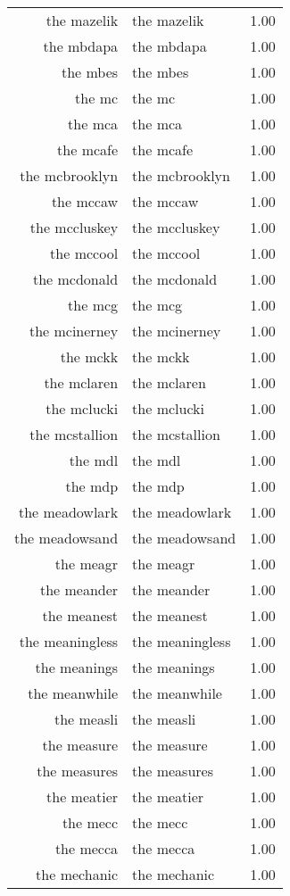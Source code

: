 \begin{table}[ht]
\begin{tabular}{rlr}
  the mazelik & the mazelik & 1.00 \\ 
  the mbdapa & the mbdapa & 1.00 \\ 
  the mbes & the mbes & 1.00 \\ 
  the mc & the mc & 1.00 \\ 
  the mca & the mca & 1.00 \\ 
  the mcafe & the mcafe & 1.00 \\ 
  the mcbrooklyn & the mcbrooklyn & 1.00 \\ 
  the mccaw & the mccaw & 1.00 \\ 
  the mccluskey & the mccluskey & 1.00 \\ 
  the mccool & the mccool & 1.00 \\ 
  the mcdonald & the mcdonald & 1.00 \\ 
  the mcg & the mcg & 1.00 \\ 
  the mcinerney & the mcinerney & 1.00 \\ 
  the mckk & the mckk & 1.00 \\ 
  the mclaren & the mclaren & 1.00 \\ 
  the mclucki & the mclucki & 1.00 \\ 
  the mcstallion & the mcstallion & 1.00 \\ 
  the mdl & the mdl & 1.00 \\ 
  the mdp & the mdp & 1.00 \\ 
  the meadowlark & the meadowlark & 1.00 \\ 
  the meadowsand & the meadowsand & 1.00 \\ 
  the meagr & the meagr & 1.00 \\ 
  the meander & the meander & 1.00 \\ 
  the meanest & the meanest & 1.00 \\ 
  the meaningless & the meaningless & 1.00 \\ 
  the meanings & the meanings & 1.00 \\ 
  the meanwhile & the meanwhile & 1.00 \\ 
  the measli & the measli & 1.00 \\ 
  the measure & the measure & 1.00 \\ 
  the measures & the measures & 1.00 \\ 
  the meatier & the meatier & 1.00 \\ 
  the mecc & the mecc & 1.00 \\ 
  the mecca & the mecca & 1.00 \\ 
  the mechanic & the mechanic & 1.00 \\ 

\end{tabular}
\end{table}
